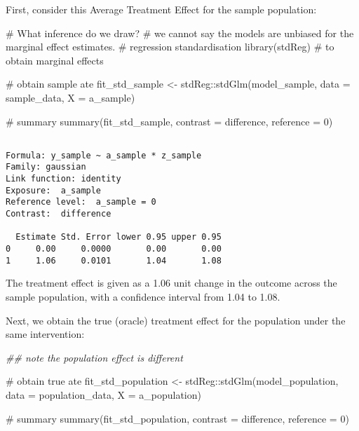 \documentclass[
  single column]{article}
\newenvironment{Shaded}{\begin{snugshade}}{\end{snugshade}}
\newcommand{\AttributeTok}[1]{\textcolor[rgb]{0.40,0.45,0.13}{#1}}
\newcommand{\CommentTok}[1]{\textcolor[rgb]{0.37,0.37,0.37}{#1}}
\newcommand{\DecValTok}[1]{\textcolor[rgb]{0.68,0.00,0.00}{#1}}
\newcommand{\DocumentationTok}[1]{\textcolor[rgb]{0.37,0.37,0.37}{\textit{#1}}}
\newcommand{\FunctionTok}[1]{\textcolor[rgb]{0.28,0.35,0.67}{#1}}
\newcommand{\NormalTok}[1]{\textcolor[rgb]{0.00,0.23,0.31}{#1}}
\newcommand{\OtherTok}[1]{\textcolor[rgb]{0.00,0.23,0.31}{#1}}
\newcommand{\SpecialCharTok}[1]{\textcolor[rgb]{0.37,0.37,0.37}{#1}}
\newcommand{\StringTok}[1]{\textcolor[rgb]{0.13,0.47,0.30}{#1}}
\begin{document}
First, consider this Average Treatment Effect for the sample population:

\begin{Shaded}
\begin{Highlighting}[]
\CommentTok{\# What inference do we draw?  }
\CommentTok{\# we cannot say the models are unbiased for the marginal effect estimates. }
\CommentTok{\# regression standardisation }
\FunctionTok{library}\NormalTok{(stdReg) }\CommentTok{\# to obtain marginal effects }

\CommentTok{\# obtain sample ate}
\NormalTok{fit\_std\_sample }\OtherTok{\textless{}{-}}\NormalTok{ stdReg}\SpecialCharTok{::}\FunctionTok{stdGlm}\NormalTok{(model\_sample, }
  \AttributeTok{data =}\NormalTok{ sample\_data, }\AttributeTok{X =} \StringTok{\textquotesingle{}a\_sample\textquotesingle{}}\NormalTok{)}

\CommentTok{\# summary}
\FunctionTok{summary}\NormalTok{(fit\_std\_sample, }\AttributeTok{contrast =} \StringTok{\textquotesingle{}difference\textquotesingle{}}\NormalTok{, }\AttributeTok{reference =} \DecValTok{0}\NormalTok{)}
\end{Highlighting}
\end{Shaded}

\begin{verbatim}

Formula: y_sample ~ a_sample * z_sample
Family: gaussian 
Link function: identity 
Exposure:  a_sample 
Reference level:  a_sample = 0 
Contrast:  difference 

  Estimate Std. Error lower 0.95 upper 0.95
0     0.00     0.0000       0.00       0.00
1     1.06     0.0101       1.04       1.08
\end{verbatim}

The treatment effect is given as a 1.06 unit change in the outcome
across the sample population, with a confidence interval from 1.04 to
1.08.

Next, we obtain the true (oracle) treatment effect for the population
under the same intervention:

\begin{Shaded}
\begin{Highlighting}[]
\DocumentationTok{\#\# note the population effect is different}

\CommentTok{\# obtain true ate}
\NormalTok{fit\_std\_population }\OtherTok{\textless{}{-}}\NormalTok{ stdReg}\SpecialCharTok{::}\FunctionTok{stdGlm}\NormalTok{(model\_population, }
  \AttributeTok{data =}\NormalTok{ population\_data, }\AttributeTok{X =} \StringTok{\textquotesingle{}a\_population\textquotesingle{}}\NormalTok{)}

\CommentTok{\# summary}
\FunctionTok{summary}\NormalTok{(fit\_std\_population, }\AttributeTok{contrast =} \StringTok{\textquotesingle{}difference\textquotesingle{}}\NormalTok{, }\AttributeTok{reference =} \DecValTok{0}\NormalTok{)}
\end{Highlighting}
\end{Shaded}
\end{document}
